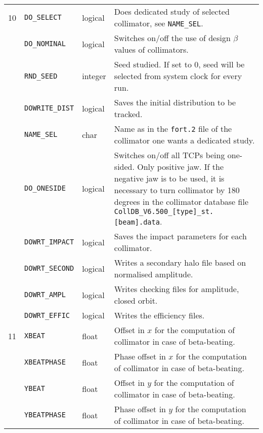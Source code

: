 \begin{center}
\begin{longtable}{| p{0.5cm} | p{2.4cm} | p{1.2cm} | >{\raggedright\arraybackslash}p{11.4cm}|}
    10  & \texttt{DO\_SELECT}    & logical & Does dedicated study of selected collimator, see \texttt{NAME\_SEL}. \\
        \cline{2-4}
        & \texttt{DO\_NOMINAL}   & logical & Switches on/off the use of design $\beta$ values of collimators. \\
        \cline{2-4}
        & \texttt{RND\_SEED}     & integer & Seed studied. If set to 0, seed will be selected from system clock for every run. \\
        \cline{2-4}
        & \texttt{DOWRITE\_DIST} & logical & Saves the initial distribution to be tracked. \\
        \cline{2-4}
        & \texttt{NAME\_SEL}     & char    & Name as in the \texttt{fort.2} file of the collimator one wants a dedicated study. \\
        \cline{2-4}
        & \texttt{DO\_ONESIDE}   & logical & Switches on/off all TCPs being one-sided. Only positive jaw. If the negative jaw is to be used, it is necessary to turn collimator by 180 degrees in the collimator database file \texttt{CollDB\_V6.500\_[type]\_st.[beam].data}. \\
        \cline{2-4}
        & \texttt{DOWRT\_IMPACT} & logical & Saves the impact parameters for each collimator. \\
        \cline{2-4}
        & \texttt{DOWRT\_SECOND} & logical & Writes a secondary halo file based on normalised amplitude. \\
        \cline{2-4}
        & \texttt{DOWRT\_AMPL}   & logical & Writes checking files for amplitude, closed orbit. \\
        \cline{2-4}
        & \texttt{DOWRT\_EFFIC}  & logical & Writes the efficiency files. \\
    \hline

    11  & \texttt{XBEAT}         & float   & Offset in $x$ for the computation of collimator in case of beta-beating\index{beta-beating}. \\
        \cline{2-4}
        & \texttt{XBEATPHASE}    & float   & Phase offset in $x$ for the computation of collimator in case of beta-beating\index{beta-beating}. \\
        \cline{2-4}
        & \texttt{YBEAT}         & float   & Offset in $y$ for the computation of collimator in case of beta-beating\index{beta-beating}. \\
        \cline{2-4}
        & \texttt{YBEATPHASE}    & float   & Phase offset in $y$ for the computation of collimator in case of beta-beating\index{beta-beating}. \\
    \hline


\end{longtable}
\end{center}

